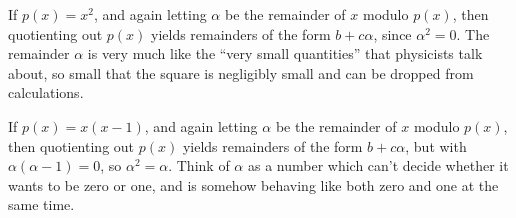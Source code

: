 \begin{example}
If \(p(x)=x^2\), and again letting \(\alpha\) be the remainder of \(x\) modulo \(p(x)\), then quotienting out \(p(x)\) yields remainders of the form \(b + c \alpha\), since \(\alpha^2=0\).
The remainder \(\alpha\) is very much like the ``very small quantities'' that physicists talk about, so small that the square is negligibly small and can be dropped from calculations.
\end{example}

\begin{example}
If \(p(x)=x(x-1)\), and again letting \(\alpha\) be the remainder of \(x\) modulo \(p(x)\), then quotienting out \(p(x)\) yields remainders of the form \(b + c \alpha\), but with \(\alpha(\alpha-1)=0\), so \(\alpha^2=\alpha\).
Think of \(\alpha\) as a number which can't decide whether it wants to be zero or one, and is somehow behaving like both zero and one at the same time.
\end{example}

